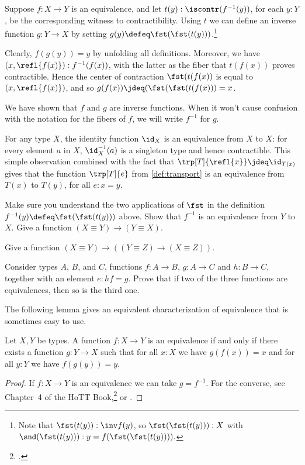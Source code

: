 Suppose $f:X \to Y$ is an equivalence, and let $t(y): \iscontr(f^{-1}(y))$, for each $y:Y$, be the corresponding witness to contractibility.
Using $t$ we can define an inverse function $g : Y \to X$ by setting $g(y)\defeq\fst(\fst(t(y)))$.\footnote{%
  Note that $\fst(t(y)) : \inv f(y)$, so $\fst(\fst(t(y))) : X$ with
  $\snd(\fst(t(y))) : y = f(\fst(\fst(t(y)))).$}

Clearly, $f(g(y)) = y$ by unfolding all definitions.
Moreover, we have $(x,\refl{f(x)}) : f^{-1}(f(x))$,
with the latter as the fiber that $t(f(x))$
proves contractible. Hence the center of contraction
$\fst(t(f(x))$ is equal to $(x,\refl{f(x)})$, and so
$g(f(x))\jdeq(\fst(\fst(t(f(x))) = x$.

We have shown that $f$ and $g$ are inverse functions.  When it won't cause confusion with the notation for the fibers of $f$, we will write
$f^{-1}$ for $g$.

For any type $X$, the identity function $\id_X$ is an
equivalence from $X$ to $X$: for every element $a$ in $X$,
$\id_X^{-1}(a)$ is a singleton type and hence contractible.
This simple observation combined with the fact that
$\trp[T]{\refl{x}}\jdeq \id_{T(x)}$ gives that
the function $\trp[T]{e}$ from \cref{def:transport}
is an equivalence from $T(x)$ to $T(y)$, for all $e: x=y$.

\begin{xca}\label{xca:equivalence-invers}
Make sure you understand the two applications of $\fst$
in the definition $f^{-1}(y)\defeq\fst(\fst(t(y)))$ above.
Show that $f^{-1}$ is an equivalence from $Y$ to $X$.
Give a function $(X\equiv Y) \to (Y\equiv X)$.
\end{xca}

\begin{xca}\label{xca:equivalence-comp}
Give  a function $(X\equiv Y) \to ((Y\equiv Z) \to (X\equiv Z))$.
\end{xca}

\begin{xca}\label{xca:2-out-of-3}
  Consider types $A$, $B$, and $C$, functions $f:A\to B$, $g:A\to C$ and $h:B\to C$, together with an element $e: hf=g$.  Prove that if two of
  the three functions are equivalences, then so is the third one.
\end{xca}

The following lemma gives an equivalent characterization
of equivalence that is sometimes easy to use.

\begin{lemma}\label{lem:weq-iso}
Let $X,Y$ be types. A function $f: X\to Y$ is an equivalence
if and only if there exists a function $g: Y\to X$ such that
for all $x:X$ we have $g(f(x))=x$ and for all
$y:Y$ we have $f(g(y))=y$.
\end{lemma}
\begin{proof}
If $f: X\to Y$ is an equivalence we can take $g=f^{-1}$.
For the converse, see Chapter~4 of the HoTT Book,\footcite{hottbook} or .
\end{proof}

